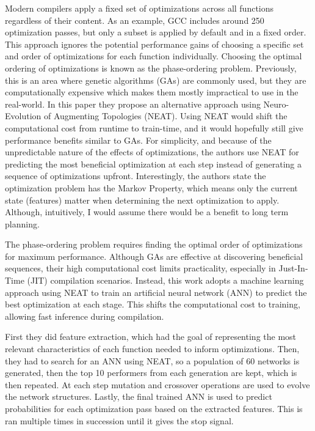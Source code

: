 \documentclass[11pt, a4paper, titlepage]{article}
\begin{document}
Modern compilers apply a fixed set of optimizations across all functions regardless of their content. As an example, GCC includes around 250 optimization passes, but only a subset is applied by default and in a fixed order. This approach ignores the potential performance gains of choosing a specific set and order of optimizations for each function individually. Choosing the optimal ordering of optimizations is known as the phase-ordering problem. Previously, this is an area where genetic algorithms (GAs) are commonly used, but they are computationally expensive which makes them mostly impractical to use in the real-world. In this paper they propose an alternative approach using Neuro-Evolution of Augmenting Topologies (NEAT). Using NEAT would shift the computational cost from runtime to train-time, and it would hopefully still give performance benefits similar to GAs. For simplicity, and because of the unpredictable nature of the effects of optimizations, the authors use NEAT for predicting the most beneficial optimization at each step instead of generating a sequence of optimizations upfront. Interestingly, the authors state the optimization problem has the Markov Property, which means only the current state (features) matter when determining the next optimization to apply. Although, intuitively, I would assume there would be a benefit to long term planning.

The phase-ordering problem requires finding the optimal order of optimizations for maximum performance. Although GAs are effective at discovering beneficial sequences, their high computational cost limits practicality, especially in Just-In-Time (JIT) compilation scenarios. Instead, this work adopts a machine learning approach using NEAT to train an artificial neural network (ANN) to predict the best optimization at each stage. This shifts the computational cost to training, allowing fast inference during compilation.

First they did feature extraction, which had the goal of representing the most relevant characteristics  of each function needed to inform optimizations. Then, they had to search for an ANN using NEAT, so a population of 60 networks is generated, then the top 10 performers from each generation are kept, which is then repeated. At each step mutation and crossover operations are used to evolve the network structures. Lastly, the final trained ANN is used to predict probabilities for each optimization pass based on the extracted features. This is ran multiple times in succession until it gives the stop signal.
\end{document}

